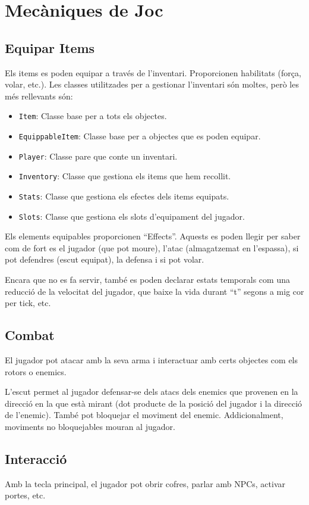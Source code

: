 \documentclass[a4paper,12pt]{article}
\begin{document}
\section{Mecàniques de Joc}

\subsection{Equipar Items}
Els items es poden equipar a través de l'inventari. Proporcionen habilitats (força, volar, etc.). Les classes utilitzades per a gestionar l'inventari són moltes, però les més rellevants són:
\begin{itemize}
    \item \texttt{Item}: Classe base per a tots els objectes.
    \item \texttt{EquippableItem}: Classe base per a objectes que es poden equipar.
    \item \texttt{Player}: Classe pare que conte un inventari.
    \item \texttt{Inventory}: Classe que gestiona els items que hem recollit.
    \item \texttt{Stats}: Classe que gestiona els efectes dels items equipats.
    \item \texttt{Slots}: Classe que gestiona els slots d'equipament del jugador.
\end{itemize}    

Els elements equipables proporcionen ``Effects''. Aquests es poden llegir per saber com de fort es el jugador (que pot moure), l'atac (almagatzemat en l'espassa), si pot defendres (escut equipat), la defensa i si pot volar.

Encara que no es fa servir, també es poden declarar estats temporals com una reducció de la velocitat del jugador, que baixe la vida durant ``t'' segons a mig cor per tick, etc. 

\subsection{Combat}
El jugador pot atacar amb la seva arma i interactuar amb certs objectes com els rotors o enemics.

L'escut permet al jugador defensar-se dels atacs dels enemics que provenen en la direcció en la que està mirant (dot producte de la posició del jugador i la direcció de l'enemic). També pot bloquejar el moviment del enemic. Addicionalment, moviments no bloquejables mouran al jugador.

\subsection{Interacció}
Amb la tecla principal, el jugador pot obrir cofres, parlar amb NPCs, activar portes, etc.
\end{document}
